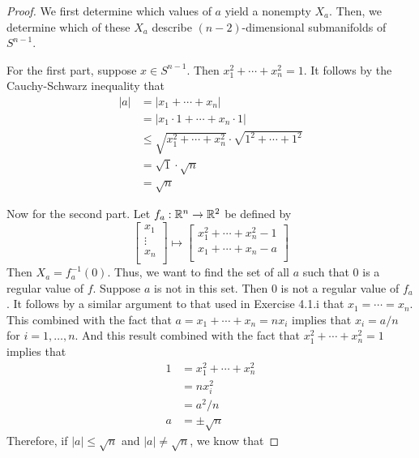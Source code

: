 \documentclass[../psets.tex]{subfiles}
\begin{document}
\begin{enumerate}[label={\textbf{4.1.\roman*.}}]
\begin{proof}
        We first determine which values of $a$ yield a nonempty $X_a$. Then, we determine which of these $X_a$ describe $(n-2)$-dimensional submanifolds of $S^{n-1}$.\par
        For the first part, suppose $x\in S^{n-1}$. Then $x_1^2+\cdots+x_n^2=1$. It follows by the Cauchy-Schwarz inequality that
        \begin{align*}
            |a| &= |x_1+\cdots+x_n|\\
            &= |x_1\cdot 1+\cdots+x_n\cdot 1|\\
            &\leq \sqrt{x_1^2+\cdots+x_n^2}\cdot\sqrt{1^2+\cdots+1^2}\\
            &= \sqrt{1}\cdot\sqrt{n}\\
            &= \sqrt{n}
        \end{align*}\par
        Now for the second part. Let $f_a:\mathbb{R}^n\to\mathbb{R}^2$ be defined by
        \begin{equation*}
            \begin{bmatrix}
                x_1\\
                \vdots\\
                x_n\\
            \end{bmatrix}
            \mapsto
            \begin{bmatrix}
                x_1^2+\cdots+x_n^2-1\\
                x_1+\cdots+x_n-a\\
            \end{bmatrix}
        \end{equation*}
        Then $X_a=f_a^{-1}(0)$. Thus, we want to find the set of all $a$ such that 0 is a regular value of $f$. Suppose $a$ is not in this set. Then 0 is not a regular value of $f_a$. It follows by a similar argument to that used in Exercise 4.1.i that $x_1=\cdots=x_n$. This combined with the fact that $a=x_1+\cdots+x_n=nx_i$ implies that $x_i=a/n$ for $i=1,\dots,n$. And this result combined with the fact that $x_1^2+\cdots+x_n^2=1$ implies that
        \begin{align*}
            1 &= x_1^2+\cdots+x_n^2\\
            &= nx_i^2\\
            &= a^2/n\\
            a &= \pm\sqrt{n}
        \end{align*}
        Therefore, if $|a|\leq\sqrt{n}$ and $|a|\neq\sqrt{n}$, we know that

\end{proof}
\end{enumerate}
\end{document}
